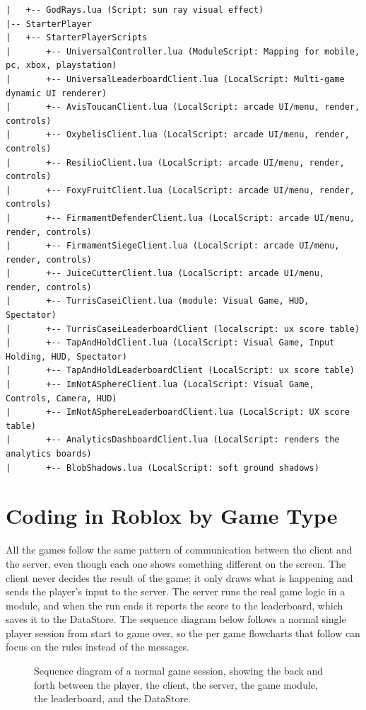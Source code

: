 \documentclass[12pt,letterpaper]{article}
\begin{document}
\begin{lstlisting}
|   +-- GodRays.lua (Script: sun ray visual effect)
|-- StarterPlayer
|   +-- StarterPlayerScripts
|       +-- UniversalController.lua (ModuleScript: Mapping for mobile, pc, xbox, playstation)
|       +-- UniversalLeaderboardClient.lua (LocalScript: Multi-game dynamic UI renderer)
|       +-- AvisToucanClient.lua (LocalScript: arcade UI/menu, render, controls)
|       +-- OxybelisClient.lua (LocalScript: arcade UI/menu, render, controls)
|       +-- ResilioClient.lua (LocalScript: arcade UI/menu, render, controls)
|       +-- FoxyFruitClient.lua (LocalScript: arcade UI/menu, render, controls)
|       +-- FirmamentDefenderClient.lua (LocalScript: arcade UI/menu, render, controls)
|       +-- FirmamentSiegeClient.lua (LocalScript: arcade UI/menu, render, controls)
|       +-- JuiceCutterClient.lua (LocalScript: arcade UI/menu, render, controls)
|       +-- TurrisCaseiClient.lua (module: Visual Game, HUD, Spectator)
|       +-- TurrisCaseiLeaderboardClient (localscript: ux score table)
|       +-- TapAndHoldClient.lua (LocalScript: Visual Game, Input Holding, HUD, Spectator)
|       +-- TapAndHoldLeaderboardClient (LocalScript: ux score table)
|       +-- ImNotASphereClient.lua (LocalScript: Visual Game, Controls, Camera, HUD)
|       +-- ImNotASphereLeaderboardClient.lua (LocalScript: UX score table)
|       +-- AnalyticsDashboardClient.lua (LocalScript: renders the analytics boards)
|       +-- BlobShadows.lua (LocalScript: soft ground shadows)
\end{lstlisting}
\clearpage

\section{Coding in Roblox by Game Type}

All the games follow the same pattern of communication between the client and the server, even though each one shows something different on the screen. The client never decides the result of the game; it only draws what is happening and sends the player's input to the server. The server runs the real game logic in a module, and when the run ends it reports the score to the leaderboard, which saves it to the DataStore. The sequence diagram below follows a normal single player session from start to game over, so the per game flowcharts that follow can focus on the rules instead of the messages.

\begin{figure}[H]
  \centering
  \resizebox{\textwidth}{!}{}
  \caption{Sequence diagram of a normal game session, showing the back and forth between the player, the client, the server, the game module, the leaderboard, and the DataStore.}
  \label{fig:sequence_session}
\end{figure}
\end{document}
